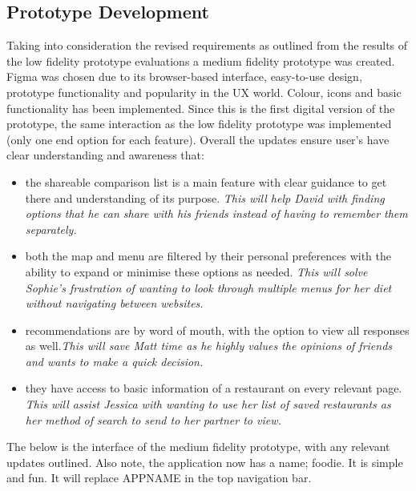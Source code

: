 \documentclass[a4 paper, 12pt]{article}
\begin{document}
    \subsection{Prototype Development}
    Taking into consideration the revised requirements as outlined from the results of the low fidelity prototype evaluations a medium fidelity prototype was created. Figma was chosen due to its browser-based interface, easy-to-use design, prototype functionality and popularity in the UX world. Colour, icons and basic functionality has been implemented. Since this is the first digital version of the prototype, the same interaction as the low fidelity prototype was implemented (only one end option for each feature). Overall the updates ensure user's have clear understanding and awareness that:
        \begin{itemize}
            \item the shareable comparison list is a main feature with clear guidance to get there and understanding of its purpose. \textit{This will help David with finding options that he can share with his friends instead of having to remember them separately.}
            \item both the map and menu are filtered by their personal preferences with the ability to expand or minimise these options as needed. \textit{This will solve Sophie's frustration of wanting to look through multiple menus for her diet without navigating between websites.}
            \item recommendations are by word of mouth, with the option to view all responses as well.\textit{This will save Matt time as he highly values the opinions of friends and wants to make a quick decision.}
            \item they have access to basic information of a restaurant on every relevant page. \textit{This will assist Jessica with wanting to use her list of saved restaurants as her method of search to send to her partner to view.}
        \end{itemize}

        The below is the interface of the medium fidelity prototype, with any relevant updates outlined. Also note, the application now has a name; foodie. It is simple and fun. It will replace APPNAME in the top navigation bar. 
\end{document}

